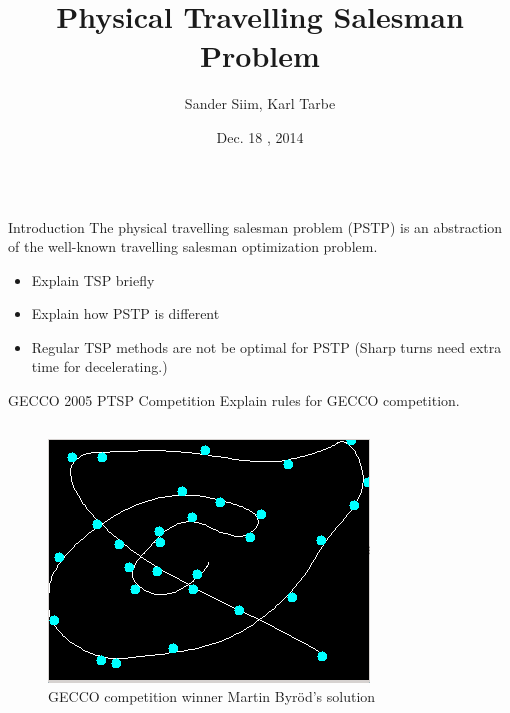 \documentclass[final,t]{beamer}
\title{\huge Physical Travelling Salesman Problem}
\author{Sander Siim, Karl Tarbe}
\institute[University of Tartu]{Institute of Computer Science, University of Tartu, Tartu, Estonia}
\date[Dec. 18 , 2014]{Dec. 18 , 2014}
\begin{document}
\begin{frame}{} 
  \begin{columns}[t]
    \begin{column}{.3\linewidth}


      \begin{block}{Introduction}
        The \alert{physical travelling salesman problem} (PSTP) is an abstraction of the well-known travelling salesman optimization problem.
        \begin{itemize}
        \item Explain TSP briefly
        \item Explain how PSTP is different
        \item Regular TSP methods are not be optimal for PSTP (Sharp turns need extra time for decelerating.)
        \end{itemize}
      \end{block}

      
      \begin{block}{GECCO 2005 PTSP Competition}
        Explain rules for GECCO competition. 
        \begin{columns}[T]
          \begin{column}{.55\linewidth} 
            \begin{figure}
              \centering
              \includegraphics[width=\linewidth]{byrod_solution.png}          
              \caption{GECCO competition winner Martin Byr\"{o}d's solution}
            \end{figure}
          \end{column}


\end{columns}
\end{block}
\end{column}
\end{columns}
\end{frame}
\end{document}
